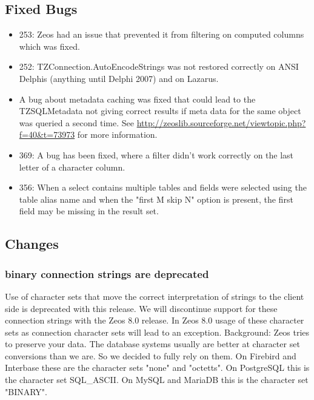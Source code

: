 \documentclass[a4paper,12pt,oneside]{book}
\begin{document}
\subsection{Fixed Bugs}
\label{sec:Rev6_General_FixedBugs}

\begin{itemize}
\item 253: Zeos had an issue that prevented it from filtering on computed columns which was fixed.
\item 252: TZConnection.AutoEncodeStrings was not restored correctly on ANSI Delphis (anything until Delphi 2007) and on Lazarus.
\item 	
  A bug about metadata caching was fixed that could lead to the TZSQLMetadata not giving correct results if meta data for the same object was queried a second time.
	See \url{http://zeoslib.sourceforge.net/viewtopic.php?f=40&t=73973} for more information.
\item
  369:
	A bug has been fixed, where a filter didn't work correctly on the last letter of a character column.
\item
  356:
	When a select contains multiple tables and fields were selected using the table alias name and when the "first M skip N" option is present, the first field may be missing in the result set. 
\end{itemize}

\subsection{Changes}
\label{sec:Rev6_General_Changes}

\subsubsection{binary connection strings are deprecated}
\label{sec:Rev6_General_Changes_BinaryConnectonStringsDeprecated}

Use of character sets that move the correct interpretation of strings to the client side is deprecated with this release.
We will discontinue support for these connection strings with the Zeos 8.0 release.
In Zeos 8.0 usage of these character sets as connection character sets will lead to an exception.
Background:
Zeos tries to preserve your data.
The database systems usually are better at character set conversions than we are.
So we decided to fully rely on them.
On Firebird and Interbase these are the character sets "none" and "octetts".
On PostgreSQL this is the character set SQL\_ASCII.
On MySQL and MariaDB this is the character set "BINARY".
\end{document}

